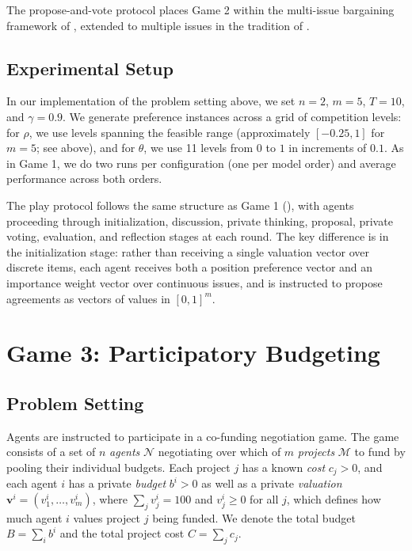 The propose-and-vote protocol places Game 2 within the multi-issue bargaining framework of \citet{rubinstein1982perfect}, extended to multiple issues in the tradition of \citet{fershtman1990importance}.

\subsection{Experimental Setup}
\label{sec:game_2_experimental_setup}

In our implementation of the problem setting above, we set $n = 2$, $m = 5$, $T = 10$, and $\gamma = 0.9$.
We generate preference instances across a grid of competition levels: for $\rho$, we use levels spanning the feasible range (approximately $[-0.25, 1]$ for $m = 5$; see above), and for $\theta$, we use 11 levels from $0$ to $1$ in increments of $0.1$.
As in Game 1, we do two runs per configuration (one per model order) and average performance across both orders.

The play protocol follows the same structure as Game 1 (), with agents proceeding through initialization, discussion, private thinking, proposal, private voting, evaluation, and reflection stages at each round.
The key difference is in the initialization stage: rather than receiving a single valuation vector over discrete items, each agent receives both a position preference vector and an importance weight vector over continuous issues, and is instructed to propose agreements as vectors of values in $[0,1]^m$.

\section{Game 3: Participatory Budgeting}

\subsection{Problem Setting}
\label{sec:game_3_problem_setting}

Agents are instructed to participate in a co-funding negotiation game.
The game consists of a set of $n$ \emph{agents} $\mathcal{N}$ negotiating over which of $m$ \emph{projects} $\mathcal{M}$ to fund by pooling their individual budgets.
Each project $j$ has a known \emph{cost} $c_j > 0$, and each agent $i$ has a private \emph{budget} $b^{i} > 0$ as well as a private \emph{valuation} $\bm{v}^{i} = (v^{i}_{1}, \dots, v^{i}_{m})$, where $\sum_j v^{i}_{j} = 100$ and $v^{i}_{j} \geq 0$ for all $j$, which defines how much agent $i$ values project $j$ being funded.
We denote the total budget $B = \sum_i b^i$ and the total project cost $C = \sum_j c_j$.

